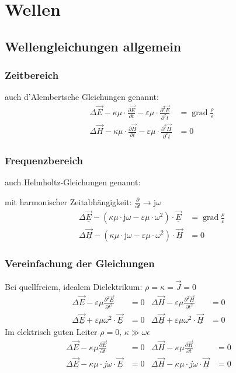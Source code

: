 \section{Wellen}
\subsection{Wellengleichungen allgemein}
\subsubsection{Zeitbereich}
auch d'Alembertsche Gleichungen genannt:
\begin{align*}
	\Delta \vec{E} -\kappa \mu \cdot \frac{\partial \vec{E}}{\partial t}-\varepsilon \mu \cdot \frac{\partial^2 \vec{E}}{\partial^2 t} & = \operatorname{grad} \frac{\rho}{\varepsilon} \\
	\Delta \vec{H} -\kappa \mu \cdot \frac{\partial \vec{H}}{\partial t}-\varepsilon \mu \cdot \frac{\partial^2 \vec{H}}{\partial^2 t} & = 0
\end{align*}
\subsubsection{Frequenzbereich}
auch Helmholtz-Gleichungen genannt:

mit harmonischer Zeitabhängigkeit:
$ \frac{\partial }{\partial t} \rightarrow \mathrm{j}\omega $
\begin{align*}
	\Delta \underline{\vec{E}}-\left(\kappa \mu \cdot \mathrm{j} \omega-\varepsilon \mu \cdot \omega^{2}\right) \cdot \underline{\vec{E}} & = \operatorname{grad} \frac{\rho}{\varepsilon} \\
	\Delta \underline{\vec{H}}-\left(\kappa \mu \cdot \mathrm{j} \omega-\varepsilon \mu \cdot \omega^{2}\right) \cdot \underline{\vec{H}} & = 0
\end{align*}

\subsubsection{Vereinfachung der Gleichungen}
Bei quellfreiem, idealem Dielektrikum: $ \rho = \kappa = \vec{J} = 0$
\begin{align*}
	\Delta \vec{E}-\varepsilon \mu \frac{\partial^{2} \vec{E}}{\partial t^{2}}      & =0 &
	\Delta \vec{H}-\varepsilon \mu \frac{\partial^{2} \vec{H}}{\partial t^{2}}      & =0 & \\
	\Delta \underline{\vec{E}}+\varepsilon \mu \omega^{2} \cdot \underline{\vec{E}} & =0 &
	\Delta \underline{\vec{H}}+\varepsilon \mu \omega^{2} \cdot \underline{\vec{H}} & =0 &
\end{align*}
Im elektrisch guten Leiter $\rho = 0,\, \kappa \gg \omega \epsilon$
\begin{align*}
	\Delta \vec{E}-\kappa \mu \frac{\partial \vec{E}}{\partial t}                  & =0 &
	\Delta \vec{H}-\kappa \mu \frac{\partial \vec{H}}{\partial t}                  & =0 & \\
	\Delta \underline{\vec{E}}-\kappa \mu \cdot j \omega \cdot \underline{\vec{E}} & =0 &
	\Delta \underline{\vec{H}}-\kappa \mu \cdot j \omega \cdot \underline{\vec{H}} & =0 &
\end{align*}

